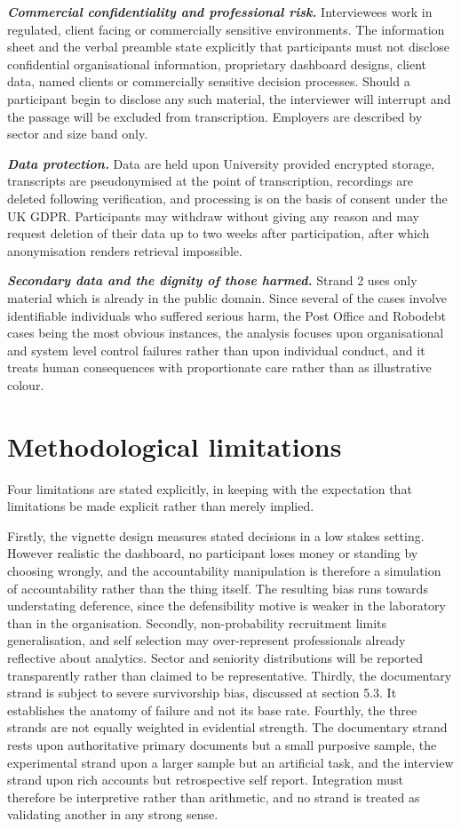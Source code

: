 \documentclass[12pt,a4paper]{article}
\begin{document}
\textbf{\emph{Commercial confidentiality and professional risk.}} Interviewees work in regulated, client
facing or commercially sensitive environments. The information sheet and the verbal preamble state
explicitly that participants must not disclose confidential organisational information, proprietary
dashboard designs, client data, named clients or commercially sensitive decision processes. Should a
participant begin to disclose any such material, the interviewer will interrupt and the passage will be
excluded from transcription. Employers are described by sector and size band only.

\textbf{\emph{Data protection.}} Data are held upon University provided encrypted storage,
transcripts are pseudonymised at the point of transcription, recordings are deleted following
verification, and processing is on the basis of consent under the UK GDPR. Participants may
withdraw without giving any reason and may request deletion of their data up to two weeks after
participation, after which anonymisation renders retrieval impossible.

\textbf{\emph{Secondary data and the dignity of those harmed.}} Strand 2 uses only material which is
already in the public domain. Since several of the cases involve identifiable individuals who suffered
serious harm, the Post Office and Robodebt cases being the most obvious instances, the analysis focuses
upon organisational and system level control failures rather than upon individual conduct, and it treats
human consequences with proportionate care rather than as illustrative colour.

\section{Methodological limitations}

Four limitations are stated explicitly, in keeping with the expectation that limitations be made explicit
rather than merely implied.

Firstly, the vignette design measures stated decisions in a low stakes setting. However realistic
the dashboard, no participant loses money or standing by choosing wrongly, and the accountability
manipulation is therefore a simulation of accountability rather than the thing itself. The
resulting bias runs towards understating deference, since the defensibility motive is weaker in
the laboratory than in the organisation. Secondly, non-probability recruitment limits
generalisation, and self selection may over-represent professionals already reflective about
analytics. Sector and seniority distributions will be reported transparently rather than claimed
to be representative. Thirdly, the documentary strand is subject to severe survivorship bias,
discussed at section 5.3. It establishes the anatomy of failure and not its base rate. Fourthly,
the three strands are not equally weighted in evidential strength. The documentary strand rests
upon authoritative primary documents but a small purposive sample, the experimental strand upon a
larger sample but an artificial task, and the interview strand upon rich accounts but
retrospective self report. Integration must therefore be interpretive rather than arithmetic, and
no strand is treated as validating another in any strong sense.
\end{document}
